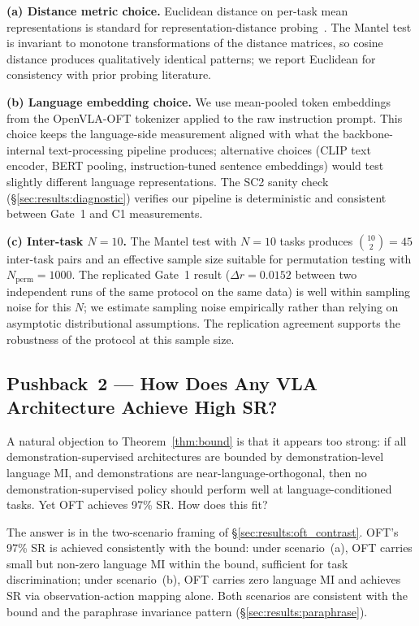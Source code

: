 \textbf{(a) Distance metric choice.} Euclidean distance on per-task mean representations
is standard for representation-distance probing~\cite{kriegeskorte2008rsa}. The Mantel
test is invariant to monotone transformations of the distance matrices, so cosine
distance produces qualitatively identical patterns; we report Euclidean for consistency
with prior probing literature.

\textbf{(b) Language embedding choice.} We use mean-pooled token embeddings from the
OpenVLA-OFT tokenizer applied to the raw instruction prompt. This choice keeps the
language-side measurement aligned with what the backbone-internal text-processing
pipeline produces; alternative choices (CLIP text encoder, BERT pooling, instruction-tuned
sentence embeddings) would test slightly different language representations. The SC2
sanity check (\S\ref{sec:results:diagnostic}) verifies our pipeline is deterministic and
consistent between Gate~1 and C1 measurements.

\textbf{(c) Inter-task $N=10$.} The Mantel test with $N = 10$ tasks produces
$\binom{10}{2} = 45$ inter-task pairs and an effective sample size suitable for
permutation testing with $N_{\text{perm}} = 1000$. The replicated Gate~1 result ($\Delta
r = 0.0152$ between two independent runs of the same protocol on the same data) is well
within sampling noise for this $N$; we estimate sampling noise empirically rather than
relying on asymptotic distributional assumptions. The replication agreement supports the
robustness of the protocol at this sample size.

\subsection{Pushback~2 --- How Does Any VLA Architecture Achieve High SR?}
\label{sec:discussion:pushback_universality}

A natural objection to Theorem~\ref{thm:bound} is that it appears too strong: if all
demonstration-supervised architectures are bounded by demonstration-level language MI,
and demonstrations are near-language-orthogonal, then no demonstration-supervised policy
should perform well at language-conditioned tasks. Yet OFT achieves 97\% SR. How does
this fit?

The answer is in the two-scenario framing of \S\ref{sec:results:oft_contrast}. OFT's
97\% SR is achieved consistently with the bound: under scenario~(a), OFT carries small
but non-zero language MI within the bound, sufficient for task discrimination; under
scenario~(b), OFT carries zero language MI and achieves SR via observation-action mapping
alone. Both scenarios are consistent with the bound and the paraphrase invariance pattern
(\S\ref{sec:results:paraphrase}).

